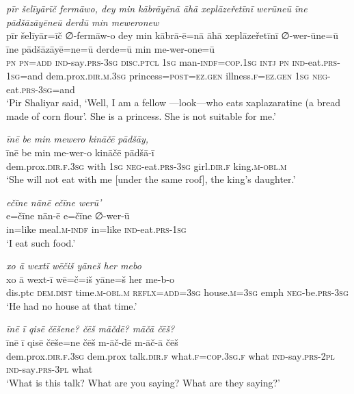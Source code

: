 \ea \label{ŽP.210}
\textit{pīr šelīyārīč fermāwo, dey min kābrāyēnā āhā xeplāzeřetīnī werūneū īne pādšāzāyēneū derdū min meweronew} \\ 
\gll pīr šelīyār=īč ∅-fermāw-o dey min kābrā-ē=nā āhā xeplāzeřetīnī ∅-wer-ūne=ū īne pādšāzāyē=ne=ū derde=ū min me-wer-one=ū \\ 
 \textsc{pn} \textsc{pn}\textsc{=add} \textsc{ind-}say\textsc{.prs}\textsc{-3sg} \textsc{disc.ptcl} \textsc{1sg} man\textsc{-indf}\textsc{=cop}\textsc{.\textsc{1sg}} \textsc{intj} \textsc{pn} \textsc{ind-}eat\textsc{.prs}\textsc{-\textsc{1sg}}=and dem.prox\textsc{.dir}\textsc{.m}\textsc{.3sg} princess\textsc{=\textsc{post}}\textsc{\textsc{=ez.gen}} illness\textsc{.f}\textsc{\textsc{=ez.gen}} \textsc{1sg} \textsc{neg-}eat\textsc{.prs}\textsc{-3sg}=and \\ 
\glt `Pir Shaliyar said, ‘Well, I am a fellow —look—who eats xaplazaratine (a bread made of corn flour’. She is a princess. She is not suitable for me.'
\z 
 
\ea \label{ŽP.213}
\textit{īnē be min mewero kināčē pādšāy,} \\ 
\gll īnē be min me-wer-o kināčē pādšā-ī \\ 
 dem.prox\textsc{.dir}\textsc{.f}\textsc{.3sg} with \textsc{1sg} \textsc{neg-}eat\textsc{.prs}\textsc{-3sg} girl\textsc{.dir}\textsc{.f} king\textsc{.m}\textsc{-obl}\textsc{.m} \\ 
\glt `She will not eat with me [under the same roof], the king’s daughter.'
\z 
 
\ea \label{ŽP.218}
\textit{ečīne nānē ečīne werū’} \\ 
\gll e=čīne nān-ē e=čīne ∅-wer-ū \\ 
 in=like meal\textsc{.m}\textsc{-indf} in=like \textsc{ind-}eat\textsc{.prs}\textsc{-\textsc{1sg}} \\ 
\glt `I eat such food.'
\z 
 
\ea \label{ŽP.219}
\textit{xo ā wextī wēčiš yāneš her mebo} \\ 
\gll xo ā wext-ī wē=č=iš yāne=š her me-b-o \\ 
 dis.ptc \textsc{dem.dist} time\textsc{.m}\textsc{-obl}\textsc{.m} \textsc{reflx}\textsc{=add}\textsc{=3sg} house\textsc{.m}\textsc{=3sg} emph \textsc{neg-}be\textsc{.prs}\textsc{-3sg} \\ 
\glt `He had no house at that time.'
\z 
 
\ea \label{ŽP.223}
\textit{īnē ī qisē čēšene? čēš māčdē? māčā čēš?} \\ 
\gll īnē ī qisē čēše=ne čēš m-āč-dē m-āč-ā čēš \\ 
 dem.prox\textsc{.dir}\textsc{.f}\textsc{.3sg} dem.prox talk\textsc{.dir}\textsc{.f} what\textsc{.f}\textsc{=cop}\textsc{.3sg}\textsc{.f} what \textsc{ind-}say\textsc{.prs}-\textsc{2pl} \textsc{ind-}say\textsc{.prs}\textsc{-3pl} what \\ 
\glt `What is this talk? What are you saying? What are they saying?'
\z 
 
